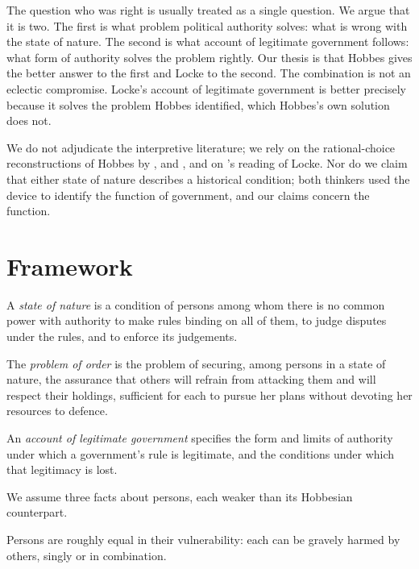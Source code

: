 \documentclass{situationist-preprint}
\begin{document}
The question who was right is usually treated as a single question. We argue that it is two. The first is what problem political authority solves: what is wrong with the state of nature. The second is what account of legitimate government follows: what form of authority solves the problem rightly. Our thesis is that Hobbes gives the better answer to the first and Locke to the second. The combination is not an eclectic compromise. Locke's account of legitimate government is better precisely because it solves the problem Hobbes identified, which Hobbes's own solution does not.

We do not adjudicate the interpretive literature; we rely on the rational-choice reconstructions of Hobbes by \citet{Gauthier1969}, \citet{Kavka1986} and \citet{Hampton1986}, and on \citet{Simmons1992}'s reading of Locke. Nor do we claim that either state of nature describes a historical condition; both thinkers used the device to identify the function of government, and our claims concern the function.

\section{Framework}

\begin{definition}\label{d:son}
A \emph{state of nature} is a condition of persons among whom there is no common power with authority to make rules binding on all of them, to judge disputes under the rules, and to enforce its judgements.
\end{definition}

\begin{definition}\label{d:problem}
The \emph{problem of order} is the problem of securing, among persons in a state of nature, the assurance that others will refrain from attacking them and will respect their holdings, sufficient for each to pursue her plans without devoting her resources to defence.
\end{definition}

\begin{definition}\label{d:account}
An \emph{account of legitimate government} specifies the form and limits of authority under which a government's rule is legitimate, and the conditions under which that legitimacy is lost.
\end{definition}

We assume three facts about persons, each weaker than its Hobbesian counterpart.

\begin{assumption}[Vulnerability]\label{a:vuln}
Persons are roughly equal in their vulnerability: each can be gravely harmed by others, singly or in combination.
\end{assumption}
\end{document}
